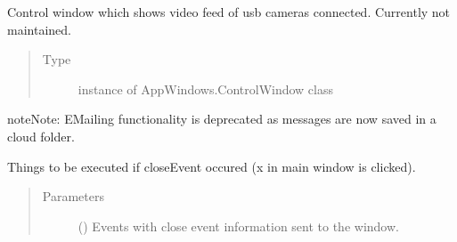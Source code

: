 \documentclass[letterpaper,10pt,english]{sphinxmanual}
\begin{document}
\begin{fulllineitems}
\begin{fulllineitems}
\begin{quote}
\begin{description}
\end{description}\end{quote}

\end{fulllineitems}


\begin{fulllineitems}
\label{\detokenize{NoSeMazeControl/main:main.MainApp.control_window}}
\pysigstartsignatures
{}
\pysigstopsignatures
\sphinxAtStartPar
Control window which shows video feed of usb cameras connected. Currently not maintained.
\begin{quote}\begin{description}
\item[{Type}] \leavevmode
\sphinxAtStartPar
instance of AppWindows.ControlWindow class

\end{description}\end{quote}

\end{fulllineitems}


\begin{sphinxadmonition}{note}{Note:}
\sphinxAtStartPar
E\sphinxhyphen{}Mailing functionality is deprecated as messages are now saved in a cloud folder.
\end{sphinxadmonition}

\begin{fulllineitems}
\label{\detokenize{NoSeMazeControl/main:main.MainApp.closeEvent}}
\pysigstartsignatures
{}
\pysigstopsignatures
\sphinxAtStartPar
Things to be executed if closeEvent occured (x in main window is clicked).
\begin{quote}\begin{description}
\item[{Parameters}] \leavevmode
\sphinxAtStartPar
{} () \textendash{} Events with close event information sent to the window.

\end{description}\end{quote}


\end{fulllineitems}
\end{fulllineitems}
\end{document}

